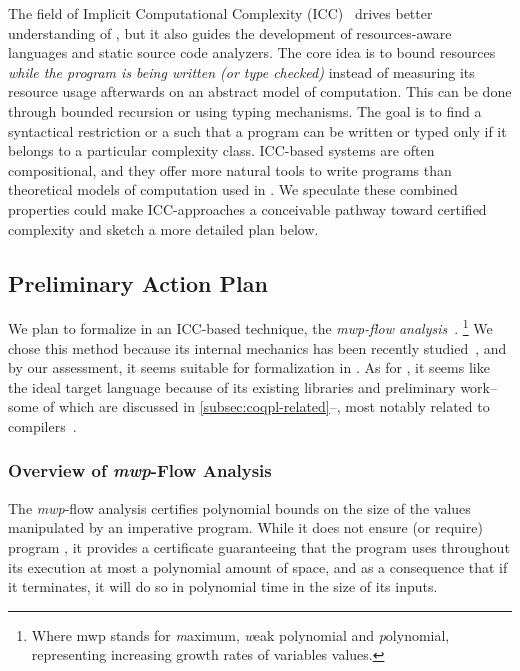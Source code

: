 The field of Implicit Computational Complexity (ICC)~\cite{dallago2011} drives
better understanding of , but it also guides the
development of resources-aware languages and static source code analyzers. The
core idea is to bound resources \emph{while the program is being written (or
type checked)} instead of measuring its resource usage afterwards on an abstract
model of computation. This can be done through \eg bounded
recursion or using typing mechanisms. The goal is to find a syntactical
restriction or a  such that a program can be written or typed
only if it belongs to a particular complexity class.
ICC-based systems are often compositional, and they
offer more natural tools to write programs than theoretical models of
computation used in . We speculate these combined
properties could make ICC-approaches a conceivable pathway toward certified
complexity and sketch a more detailed plan below.

\subsection{Preliminary Action Plan}
\label{subsec:coqpl-preliminary-action-plan}

We plan to formalize in  an ICC-based 
technique, the \emph{mwp-flow analysis}~\cite{jones2009}.%
\footnote{Where mwp stands for \emph{m}aximum, \emph{w}eak
polynomial and \emph{p}olynomial, representing increasing growth rates
of variables values.}
We chose this method because its internal mechanics has been recently
studied~\cite{aubert20222}, and by our assessment, it seems suitable for
formalization in . As for , it seems like the ideal target
language because of its existing libraries and preliminary work--some of which
are discussed in \autoref{subsec:coqpl-related}--, most notably related to
compilers~\cite{leroy2009}.

\subsubsection{Overview of \emph{mwp}-Flow Analysis}
\label{subsubsec:coqpl-overview-of-mwp-flow-analysis}

The \emph{mwp}-flow analysis certifies polynomial bounds on the size of the
values manipulated by an imperative program. While it
does not ensure (or require) program , it provides a
certificate guaranteeing that the program uses throughout its execution at most
a polynomial amount of space, and as a consequence that if it terminates, it
will do so in polynomial time in the size of its inputs.

